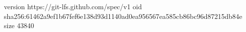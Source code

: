 version https://git-lfs.github.com/spec/v1
oid sha256:61462a9ef1b67fef6e138d93d1140ad0ea956567ea585cb86bc96d87215db84e
size 43840
